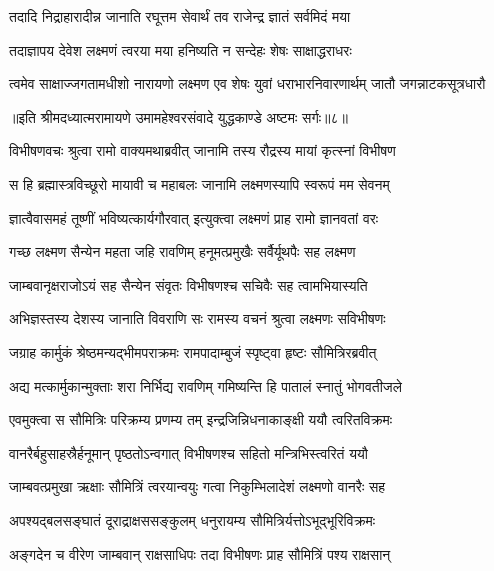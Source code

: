 \twolineshloka
{तदादि निद्राहारादीन्न जानाति रघूत्तम}
{सेवार्थं तव राजेन्द्र ज्ञातं सर्वमिदं मया} %

\twolineshloka
{तदाज्ञापय देवेश लक्ष्मणं त्वरया मया}
{हनिष्यति न सन्देहः शेषः साक्षाद्धराधरः} %

\fourlineindentedshloka
{त्वमेव साक्षाज्जगतामधीशो}
{नारायणो लक्ष्मण एव शेषः}
{युवां धराभारनिवारणार्थम्}
{जातौ जगन्नाटकसूत्रधारौ} %

{॥इति श्रीमदध्यात्मरामायणे उमामहेश्वरसंवादे युद्धकाण्डे अष्टमः
सर्गः॥८॥
}





\twolineshloka
{विभीषणवचः श्रुत्वा रामो वाक्यमथाब्रवीत्}
{जानामि तस्य रौद्रस्य मायां कृत्स्नां विभीषण} %

\twolineshloka
{स हि ब्रह्मास्त्रविच्छूरो मायावी च महाबलः}
{जानामि लक्ष्मणस्यापि स्वरूपं मम सेवनम्} %

\twolineshloka
{ज्ञात्वैवासमहं तूष्णीं भविष्यत्कार्यगौरवात्}
{इत्युक्त्वा लक्ष्मणं प्राह रामो ज्ञानवतां वरः} %

\twolineshloka
{गच्छ लक्ष्मण सैन्येन महता जहि रावणिम्}
{हनूमत्प्रमुखैः सर्वैर्यूथपैः सह लक्ष्मण} %

\twolineshloka
{जाम्बवानृक्षराजोऽयं सह सैन्येन संवृतः}
{विभीषणश्च सचिवैः सह त्वामभियास्यति} %

\twolineshloka
{अभिज्ञस्तस्य देशस्य जानाति विवराणि सः}
{रामस्य वचनं श्रुत्वा लक्ष्मणः सविभीषणः} %

\twolineshloka
{जग्राह कार्मुकं श्रेष्ठमन्यद्भीमपराक्रमः}
{रामपादाम्बुजं स्पृष्ट्वा हृष्टः सौमित्रिरब्रवीत्} %

\twolineshloka
{अद्य मत्कार्मुकान्मुक्ताः शरा निर्भिद्य रावणिम्}
{गमिष्यन्ति हि पातालं स्नातुं भोगवतीजले} %

\twolineshloka
{एवमुक्त्वा स सौमित्रिः परिक्रम्य प्रणम्य तम्}
{इन्द्रजिन्निधनाकाङ्क्षी ययौ त्वरितविक्रमः} %

\twolineshloka
{वानरैर्बहुसाहस्रैर्हनूमान् पृष्ठतोऽन्वगात्}
{विभीषणश्च सहितो मन्त्रिभिस्त्वरितं ययौ} %

\twolineshloka
{जाम्बवत्प्रमुखा ऋक्षाः सौमित्रिं त्वरयान्वयुः}
{गत्वा निकुम्भिलादेशं लक्ष्मणो वानरैः सह} %

\twolineshloka
{अपश्यद्बलसङ्घातं दूराद्राक्षससङ्कुलम्}
{धनुरायम्य सौमित्रिर्यत्तोऽभूद्भूरिविक्रमः} %

\twolineshloka
{अङ्गदेन च वीरेण जाम्बवान् राक्षसाधिपः}
{तदा विभीषणः प्राह सौमित्रिं पश्य राक्षसान्} %

